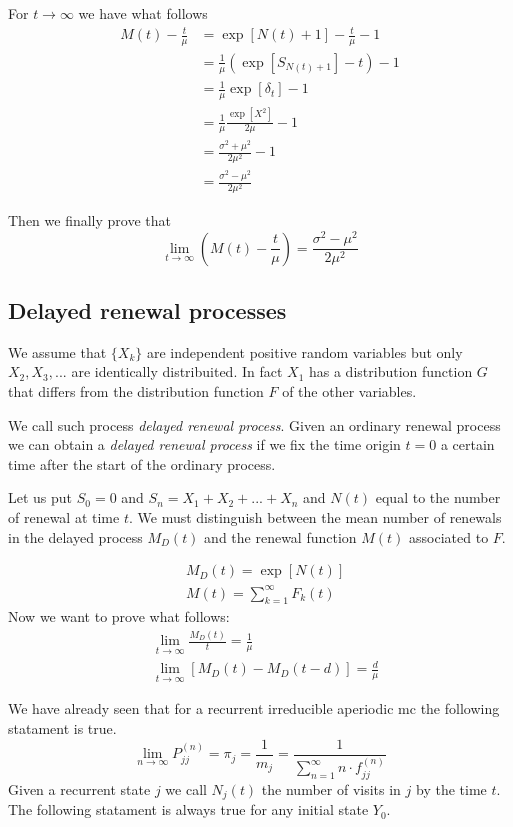 For $t \rightarrow \infty$ we have what follows
\begin{align*}
	M(t)-\frac{t}{\mu} & =\exp[N(t)+1]-\frac{t}{\mu}-1 \\
	& = \frac{1}{\mu} (\exp[S_{N(t)+1}]-t)-1 \\
	& = \frac{1}{\mu} \exp[\delta_t]-1 \\
	& = \frac{1}{\mu}\frac{\exp[X^2]}{2\mu}-1 \\
	& = \frac{\sigma^2+\mu^2}{2\mu^2}-1 \\
	& = \frac{\sigma^2-\mu^2}{2\mu^2}
\end{align*}

Then we finally prove that
\begin{equation}
	\lim_{t \rightarrow \infty} \left( M(t) - \frac{t}{\mu} \right) = \frac{\sigma^2-\mu^2}{2\mu^2}
\end{equation}

\subsection{Delayed renewal processes}
	We assume that $\{X_k\}$ are independent positive random variables but only $X_2,X_3,...$ are identically distribuited.
	In fact $X_1$ has a distribution function $G$ that differs from the distribution function $F$ of the other variables.

	We call such process \textit{delayed renewal process}. Given an ordinary renewal process we can obtain a \textit{delayed renewal process} if we fix the time origin $t=0$ a certain time after the start of the ordinary process.

	Let us put $S_0=0$ and $S_n=X_1+X_2+...+X_n$ and $N(t)$ equal to the number of renewal at time $t$. We must distinguish between the mean number of renewals in the delayed process $M_D(t)$ and the renewal function  $M(t)$ associated to $F$.

	\begin{align}
		& M_D(t) = \exp[N(t)]
		\\ & M(t) = \sum_{k=1}^{\infty}F_k(t)
	\end{align}
	Now we want to prove what follows:
	\begin{align*}
		& \lim_{t \to \infty }\frac{M_D(t)}{t}=\frac{1}{\mu}
		\\ & \lim_{t \to \infty }[M_D(t)-M_D(t-d)]=\frac{d}{\mu}
	\end{align*}

	We have already seen that for a recurrent irreducible aperiodic \gls{mc} the following statament is true.
	\begin{equation}
		\lim_{n \to \infty} P_{jj}^{(n)}=\pi_j=\frac{1}{m_j}=\frac{1}{\sum_{n=1}^{\infty}n \cdot f_{jj}^{(n)}}
	\end{equation}
	Given a recurrent state $j$ we call $N_j(t)$ the number of visits in $j$ by the time $t$. The following statament is always true for any initial state $Y_0$.

